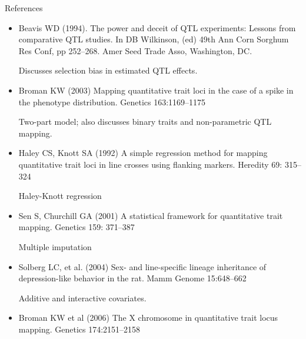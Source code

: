 \documentclass[12pt]{article}
\newcommand{\headsize}{\fontsize{35}{35} \selectfont}
\newcommand{\smallestsize}{\fontsize{18}{22} \selectfont}
\begin{document}
\newpage

\headsize \color{myyellow}
\hfill \begin{minipage}{5.75in}
\centering
References
\end{minipage}

\vspace*{15mm}

\color{mywhite} \smallestsize

\hspace*{0.5in}
\begin{minipage}{9.5in}
\begin{itemize}
\itemsep8pt
\item Beavis WD (1994). The power and deceit of QTL experiments:
  Lessons from comparative QTL studies. In DB Wilkinson,
  (ed) 49th Ann Corn Sorghum Res Conf, pp
  252--268. Amer Seed Trade Asso, Washington, DC.

{\color{myblue} Discusses selection bias in estimated QTL effects.}

\item Broman KW (2003) Mapping quantitative trait loci in the case of
  a spike in the phenotype distribution. Genetics 163:1169--1175

{\color{myblue} Two-part model; also discusses binary traits and
  non-parametric QTL mapping.}

\item Haley CS, Knott SA (1992) A simple regression method for mapping
  quantitative trait loci in line crosses using flanking
  markers. Heredity 69: 315--324

{\color{myblue} Haley-Knott regression}

\item Sen S, Churchill GA (2001) A statistical framework for
  quantitative trait mapping. Genetics 159: 371--387

{\color{myblue} Multiple imputation}

\item Solberg LC, et al. (2004) Sex- and line-specific lineage
  inheritance of depression-like behavior in the rat. Mamm Genome
  15:648--662

{\color{myblue} Additive and interactive covariates.}

\item Broman KW et al (2006) The X chromosome in quantitative trait
  locus mapping. Genetics 174:2151--2158

\end{itemize}
\end{minipage}
\end{document}
